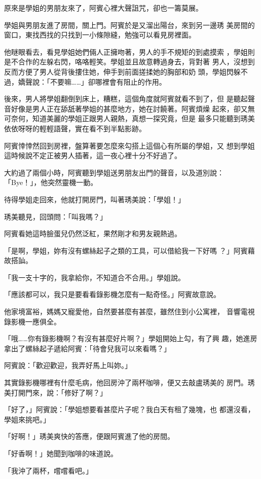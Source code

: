 原來是學姐的男朋友來了，阿賓心裡大聲詛咒，卻也一籌莫展。

學姐與男朋友進了房間，關上門。阿賓於是又溜出陽台，來到另一邊琇
美房間的窗口，東找西找的只找到一小條隙縫，勉強可以看見房裡面。

他瞇眼看去，看見學姐她們倆人正擁吻著，男人的手不規矩的到處摸索
，學姐則是不合作的左躲右閃，咯咯輕笑。學姐並且故意轉過身去，背對著
男人，沒想到反而方便了男人從背後摟住她，伸手到前面搓揉她的胸部和奶
頭，學姐閃躲不過，嬌聲說：「不要嘛……」卻哪裡會有阻止的作用。

後來，男人將學姐翻倒到床上，糟糕，這個角度就阿賓就看不到了，但
是聽起聲音好像是男人正在舔舐著學姐的甚麼地方，她在討饒著。阿賓煩燥
起來，卻又無可奈何，知道美麗的學姐正跟男人親熱，真想一探究竟，但是
最多只能聽到琇美依依呀呀的輕輕語聲，實在看不到半點影跡。

阿賓悻悻然回到房裡，盤算著要怎麼來勾搭上這個心有所屬的學姐，又
想到學姐這時候說不定正被男人插著，這一夜心裡十分不好過了。

大約過了兩個小時，阿賓聽到學姐送男朋友出門的聲音，以及道別說：
「Bye！」，他突然靈機一動。

待得學姐走回來，他就打開房門，叫著琇美說：「學姐！」

琇美聽見，回頭問：「叫我嗎？」

阿賓看她這時臉蛋兒仍然泛紅，果然剛才和男友親熱過。

「是啊，學姐，妳有沒有螺絲起子之類的工具，可以借給我一下好嗎
？」阿賓藉故搭訕。

「我一支十字的，我拿給你，不知道合不合用。」學姐說。

「應該都可以，我只是要看看錄影機怎麼有一點奇怪。」阿賓故意說。

他家境富裕，媽媽又寵愛他，自然要甚麼有甚麼，雖然住到小公寓裡，
音響電視錄影機一應俱全。

「哦……你有錄影機啊？有沒有甚麼好片啊？」學姐開始上勾，有了興
趣，她進房拿出了螺絲起子遞給阿賓：「待會兒我可以來看嗎？」

阿賓說：「歡迎歡迎，我弄好馬上叫妳。」

其實錄影機哪裡有什麼毛病，他回房沖了兩杯咖啡，便又去敲盧琇美的
房門。琇美打開門來，說：「修好了啊？」

「好了，」阿賓說：「學姐想要看甚麼片子呢？我白天有租了幾塊，也
都還沒看，學姐來挑吧。」

「好啊！」琇美爽快的答應，便跟阿賓進了他的房間。

「好香啊！」她聞到咖啡的味道說。

「我沖了兩杯，嚐嚐看吧。」

